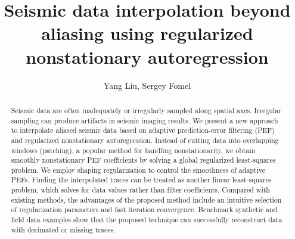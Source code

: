 \title{Seismic data interpolation beyond aliasing using regularized nonstationary autoregression}

\renewcommand{\thefootnote}{\fnsymbol{footnote}}


\address{
\footnotemark[1] College of Geo-exploration Science and Technology,\\
Jilin University \\
No.6 Xi minzhu street, \\
Changchun, China, 130026 \\
\footnotemark[2] Bureau of Economic Geology,\\
John A. and Katherine G. Jackson School of Geosciences \\
The University of Texas at Austin \\
University Station, Box X \\
Austin, TX, USA, 78713-8924}

\author{Yang Liu\footnotemark[1], Sergey Fomel\footnotemark[2]}

\maketitle

\begin{abstract}
Seismic data are often inadequately or irregularly sampled along
spatial axes. Irregular sampling can produce
artifacts in seismic imaging results. We present a new approach to
interpolate aliased seismic data based on adaptive prediction-error
filtering (PEF) and regularized nonstationary autoregression. Instead
of cutting data into overlapping windows (patching), a popular method
for handling nonstationarity, we obtain smoothly nonstationary PEF
coefficients by solving a global regularized least-squares
problem. We employ shaping regularization to
control the smoothness of adaptive PEFs. Finding the interpolated
traces can be treated as another linear least-squares problem, which
solves for data values rather than filter coefficients. Compared with
existing methods, the advantages of the proposed method include an
intuitive selection of regularization parameters and fast
iteration convergence. Benchmark synthetic and
field data examples show that the proposed technique can successfully
reconstruct data with decimated or missing traces.

\end{abstract}

